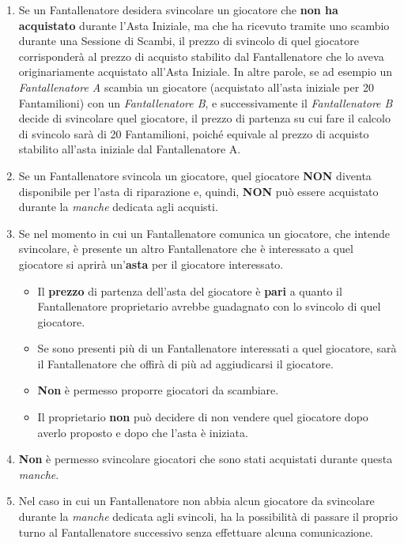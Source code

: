 \documentclass[12pt]{article}
\begin{document}
\begin{enumerate}
\begin{enumerate}
        \item Se un Fantallenatore desidera svincolare un giocatore che \textbf{non ha acquistato} durante l'Asta Iniziale, ma che ha ricevuto tramite uno scambio durante una Sessione di Scambi, il prezzo di svincolo di quel giocatore corrisponderà al prezzo di acquisto stabilito dal Fantallenatore che lo aveva originariamente acquistato all'Asta Iniziale. In altre parole, se ad esempio un \textit{Fantallenatore A} scambia un giocatore (acquistato all'asta iniziale per 20 Fantamilioni) con un \textit{Fantallenatore B}, e successivamente il \textit{Fantallenatore B} decide di svincolare quel giocatore, il prezzo di partenza su cui fare il calcolo di svincolo sarà di 20 Fantamilioni, poiché equivale al prezzo di acquisto stabilito all'asta iniziale dal Fantallenatore A.
        \item Se un Fantallenatore svincola un giocatore, quel giocatore \textbf{NON} diventa disponibile per l'asta di riparazione e, quindi, \textbf{NON} può essere acquistato durante la \textit{manche} dedicata agli acquisti.
        \item Se nel momento in cui un Fantallenatore comunica un giocatore, che intende svincolare, è presente un altro Fantallenatore che è interessato a quel giocatore si aprirà un'\textbf{asta} per il giocatore interessato. 
        \begin{itemize}
            \item Il \textbf{prezzo} di partenza dell'asta del giocatore è \textbf{pari} a quanto il Fantallenatore proprietario avrebbe guadagnato con lo svincolo di quel giocatore. 
            \item Se sono presenti più di un Fantallenatore interessati a quel giocatore, sarà il Fantallenatore che offirà di più ad aggiudicarsi il giocatore.
            \item \textbf{Non} è permesso proporre giocatori da scambiare.
            \item Il proprietario \textbf{non} può decidere di non vendere quel giocatore dopo averlo proposto e dopo che l'asta è iniziata.
        \end{itemize}
        \item \textbf{Non} è permesso svincolare giocatori che sono stati acquistati durante questa \textit{manche}.
        \item Nel caso in cui un Fantallenatore non abbia alcun giocatore da svincolare durante la \textit{manche} dedicata agli svincoli, ha la possibilità di passare il proprio turno al Fantallenatore successivo senza effettuare alcuna comunicazione.

\end{enumerate}
\end{enumerate}
\end{document}
